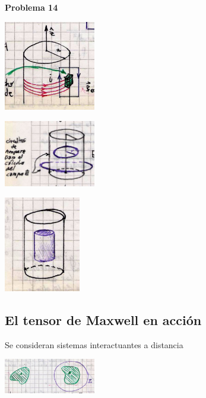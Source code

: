 \documentclass[10pt,oneside]{CBFT_book}
\begin{document}
\begin{ejemplo}{\bf Problema 14}

\includegraphics[width=0.3\textwidth]{images/fig_ft1_problema14A.jpg}

\includegraphics[width=0.3\textwidth]{images/fig_ft1_problema14B.jpg}

\includegraphics[width=0.25\textwidth]{images/fig_ft1_problema14C.jpg}
 
\end{ejemplo}





\subsection{El tensor de Maxwell en acción}

Se consideran sistemas interactuantes a distancia

\includegraphics[width=0.3\textwidth]{images/fig_ft1_PicsMaxwellA.jpg}
\end{document}
